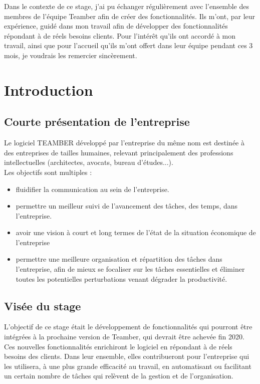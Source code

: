 \documentclass[12pt]{article}
\begin{document}
Dans le contexte de ce stage, j'ai pu échanger régulièrement avec l'ensemble des membres de l'équipe Teamber afin de créer des fonctionnalités. Ils m'ont, par leur expérience, guidé dans mon travail afin de développer des fonctionnalités répondant à de réels besoins clients. Pour l'intérêt qu'ils ont accordé à mon travail, ainsi que pour l'accueil qu'ils m'ont offert dans leur équipe pendant ces 3 mois, je voudrais les remercier sincèrement.\\

\newpage
 
\tableofcontents






\newpage


\section{Introduction}
\subsection{Courte présentation de l'entreprise}
Le logiciel TEAMBER développé par l'entreprise du même nom est destinée à des entreprises de tailles humaines, relevant principalement des professions intellectuelles (architectes, avocats, bureau d'études...). \\
Les objectifs sont multiples : 
\begin{itemize}
\item fluidifier la communication au sein de l'entreprise.
\item permettre un meilleur suivi de l'avancement des tâches, des temps, dans l'entreprise.
\item avoir une vision à court et long termes de l'état de la situation économique de l'entreprise
\item permettre une meilleure organisation et répartition des tâches dans l'entreprise, afin de mieux se focaliser sur les tâches essentielles et éliminer toutes les potentielles perturbations venant dégrader la productivité.
\end{itemize}
\subsection{Visée du stage}
L'objectif de ce stage était le développement de fonctionnalités qui pourront être intégrées à la prochaine version de Teamber, qui devrait être achevée fin 2020. \\
Ces nouvelles fonctionnalités enrichiront le logiciel en répondant à de réels besoins des clients. Dans leur ensemble, elles contribueront pour l'entreprise qui les utilisera, à une plus grande efficacité au travail, en automatisant ou facilitant un certain nombre de tâches qui relèvent de la gestion et de l'organisation.
\end{document}
